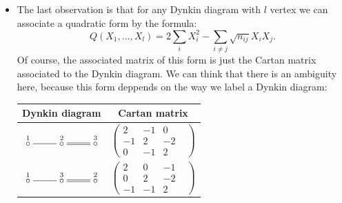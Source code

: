 \begin{itemize}
\item The last observation is that for any Dynkin diagram with $l$ vertex we can associate a quadratic form by the formula:
\begin{equation}
    Q(X_1,\dots, X_l)=2\sum_iX_i^2-\sum_{i\neq j}\sqrt{n_{ij}}X_iX_j.
\end{equation}
Of course, the associated matrix of this form is just the Cartan matrix associated to the Dynkin diagram. 
We can think that there is an ambiguity here, because this form deppends on the way we label a Dynkin diagram:
\begin{center}
    \begin{tabular}{|c|c|}
        \hline 
        Dynkin diagram & Cartan matrix\\
        \hline
        $\xymatrix{
            \overset{1}{\circ} \ar@{-}[r]& 
             \overset{2}{\circ} \ar@{-}@<0.2ex>[r]\ar@{-}@<-0.2ex>[r]&
              \overset{3}{\circ}}$ 
              &
              $\left(\begin{smallmatrix}
                2&-1&0\\-1&2&-2\\0&-1&2&
              \end{smallmatrix}\right)
              $\\
            \hline 
$\xymatrix{
            \overset{1}{\circ} \ar@{-}[r]& 
             \overset{3}{\circ} \ar@{-}@<0.2ex>[r]\ar@{-}@<-0.2ex>[r]&
              \overset{2}{\circ}}$ 
              &
              $\left(\begin{smallmatrix}
                2&0&-1\\0&2&-2\\-1&-1&2&
              \end{smallmatrix}\right)
              $\\
            \hline 
    \end{tabular}
\end{center}


\end{itemize}
